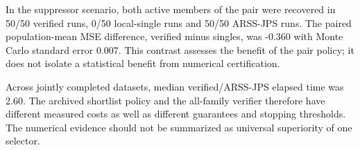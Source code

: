 In the suppressor scenario, both active members of the pair were recovered in 50/50 verified runs, 0/50 local-single runs and 50/50 ARSS-JPS runs. The paired population-mean MSE difference, verified minus singles, was -0.360 with Monte Carlo standard error 0.007. This contrast assesses the benefit of the pair policy; it does not isolate a statistical benefit from numerical certification.

Across jointly completed datasets, median verified/ARSS-JPS elapsed time was 2.60. The archived shortlist policy and the all-family verifier therefore have different measured costs as well as different guarantees and stopping thresholds. The numerical evidence should not be summarized as universal superiority of one selector.
